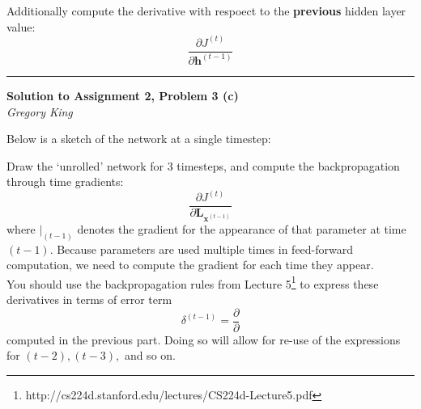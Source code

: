 \documentclass[letter,12pt]{article}
\newcommand{\myhwtitle}[3]
{\begin{center}
{\large {\bf Solution to Assignment {#1}, Problem {#2}}}\\
\medskip 
{\it {#3}} %
\end{center}}
\newcommand{\solutionsAuthor}{Gregory King}
\begin{document}
\noindent Additionally compute the derivative with respoect to the \textbf{previous} hidden layer value:
\begin{equation}
\frac{\partial{J^(t)}}{\partial{\boldsymbol h}^{(t-1)}}
\end{equation}
\vspace{5mm}
\noindent\rule{\textwidth}{0.4pt}

\clearpage

\myhwtitle{2}{3 (c)}{\solutionsAuthor}

\bigskip

\noindent Below is a sketch of the network at a single timestep:
\begin{center}
\end{center}

\noindent Draw the `unrolled' network for 3 timesteps, and compute the backpropagation through time gradients:
\begin{equation}
\frac{\partial{J^(t)}}{\partial{\boldsymbol L}_{{\boldsymbol x}^{(t-1)}}}
\end{equation}
\noindent where $\big\rvert_{(t-1)}$ denotes the gradient for the appearance of that parameter at time $(t-1)$. Because parameters are used multiple times in feed-forward computation, we need to compute the gradient for each time they appear.\\

\noindent You should use the backpropagation rules from Lecture 5\footnote{http://cs224d.stanford.edu/lectures/CS224d-Lecture5.pdf} to express these derivatives in terms of error term
\begin{equation}
\delta^{(t-1)} = \frac{\partial}{\partial}
\end{equation}
computed in the previous part. Doing so will allow for re-use of the expressions for $(t-2), (t-3),$ and so on.\\
\end{document}
